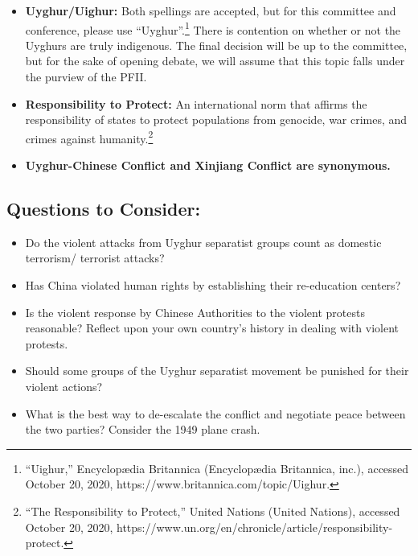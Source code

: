\documentclass[10pt, letterpaper]{article}
\begin{document}
\begin{itemize}
\item
  
  \textbf{Uyghur/Uighur:} Both spellings are accepted, but for this committee and
  conference, please use ``Uyghur''.\footnote{``Uighur,'' Encyclopædia
    Britannica (Encyclopædia Britannica, inc.), accessed October 20,
    2020, https://www.britannica.com/topic/Uighur.} There is contention
  on whether or not the Uyghurs are truly indigenous. The final decision
  will be up to the committee, but for the sake of opening debate, we
  will assume that this topic falls under the purview of the PFII.
  
\item
  
 \textbf{ Responsibility to Protect:} An international norm that affirms the
  responsibility of states to protect populations from genocide, war
  crimes, and crimes against humanity.\footnote{``The Responsibility to
    Protect,'' United Nations (United Nations), accessed October 20,
    2020,
    https://www.un.org/en/chronicle/article/responsibility-protect.}
  
\item
  
  \textbf{Uyghur-Chinese Conflict and Xinjiang Conflict are synonymous.}
  
\end{itemize}

\subsection{Questions to Consider:}

\begin{itemize}
\item
  
  Do the violent attacks from Uyghur separatist groups count as domestic
  terrorism/ terrorist attacks?
  
\item
  
  Has China violated human rights by establishing their re-education
  centers?
  
\item
  
  Is the violent response by Chinese Authorities to the violent protests
  reasonable? Reflect upon your own country's history in dealing with
  violent protests.
  
\item
  
  Should some groups of the Uyghur separatist movement be punished for
  their violent actions?
  
\item
  
  What is the best way to de-escalate the conflict and negotiate peace
  between the two parties? Consider the 1949 plane crash.
  
\end{itemize}
\end{document}
